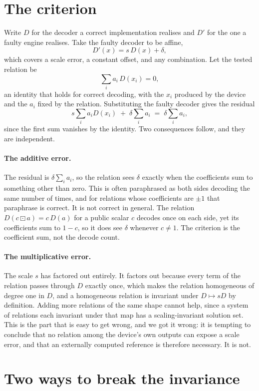 \documentclass[11pt,a4paper]{article}
\begin{document}
\section{The criterion}

Write $D$ for the decoder a correct implementation realises and $D'$ for the one a faulty engine
realises. Take the faulty decoder to be affine,
\[
D'(x) = s\,D(x) + \delta,
\]
which covers a scale error, a constant offset, and any combination. Let the tested relation be
\[
\sum_i a_i\, D(x_i) = 0,
\]
an identity that holds for correct decoding, with the $x_i$ produced by the device and the $a_i$
fixed by the relation. Substituting the faulty decoder gives the residual
\[
s \sum_i a_i D(x_i) \;+\; \delta \sum_i a_i \;=\; \delta \sum_i a_i ,
\]
since the first sum vanishes by the identity. Two consequences follow, and they are independent.

\paragraph{The additive error.} The residual is $\delta \sum_i a_i$, so the relation sees $\delta$
exactly when the coefficients sum to something other than zero. This is often paraphrased as both
sides decoding the same number of times, and for relations whose coefficients are $\pm 1$ that
paraphrase is correct. It is not correct in general. The relation $D(c \boxdot a) = c\,D(a)$ for a
public scalar $c$ decodes once on each side, yet its coefficients sum to $1 - c$, so it does see
$\delta$ whenever $c \neq 1$. The criterion is the coefficient sum, not the decode count.

\paragraph{The multiplicative error.} The scale $s$ has factored out entirely. It factors out
because every term of the relation passes through $D$ exactly once, which makes the relation
homogeneous of degree one in $D$, and a homogeneous relation is invariant under $D \mapsto sD$ by
definition. Adding more relations of the same shape cannot help, since a system of relations each
invariant under that map has a scaling-invariant solution set. This is the part that is easy to get
wrong, and we got it wrong: it is tempting to conclude that no relation among the device's own
outputs can expose a scale error, and that an externally computed reference is therefore necessary.
It is not.

\section{Two ways to break the invariance}
\end{document}
